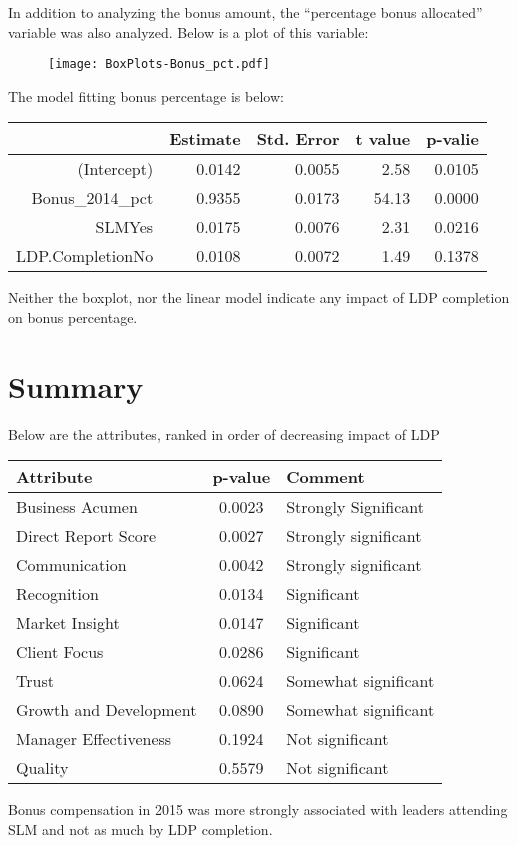 \documentclass[11pt]{extarticle} %
\begin{document}
In addition to analyzing the bonus amount, the ``percentage bonus allocated'' variable was also analyzed. Below is a plot of this variable:
\begin{figure}[H]
\centering 
\texttt{[image: BoxPlots-Bonus\_pct.pdf]}
\end{figure}
The model fitting bonus percentage is below:
\begin{table}[H]
\centering
\begin{tabular}{rrrrr}
  \hline
 & Estimate & Std. Error & t value & p-valie \\ 
  \hline
(Intercept) & 0.0142 & 0.0055 & 2.58 & 0.0105 \\ 
  Bonus\_2014\_pct & 0.9355 & 0.0173 & 54.13 & 0.0000 \\ 
  SLMYes & 0.0175 & 0.0076 & 2.31 & 0.0216 \\ 
  LDP.CompletionNo & 0.0108 & 0.0072 & 1.49 & 0.1378 \\ 
   \hline
\end{tabular}
\end{table}
Neither the boxplot, nor the linear model indicate any impact of LDP completion on bonus percentage. 


\section*{Summary}
Below are the attributes, ranked in order of decreasing impact of LDP
\begin{table}[H]
\centering
\begin{tabular}{l|c|l}
\hline
\hline
Attribute & p-value & Comment \\
\hline
Business Acumen 	& 0.0023 & Strongly Significant \\
Direct Report Score 	& 0.0027 & Strongly significant \\
Communication 		& 0.0042 & Strongly significant \\
Recognition 		& 0.0134 & Significant \\
Market Insight 		& 0.0147 & Significant \\
Client Focus 		& 0.0286 & Significant \\
Trust 			& 0.0624 & Somewhat significant \\
Growth and Development 	& 0.0890 & Somewhat significant \\
Manager Effectiveness 	& 0.1924 & Not significant \\
Quality 		& 0.5579 & Not significant \\
\hline
\hline
\end{tabular}
\end{table}

Bonus compensation in 2015 was more strongly associated with leaders attending SLM and not as much by LDP completion.
\end{document}
